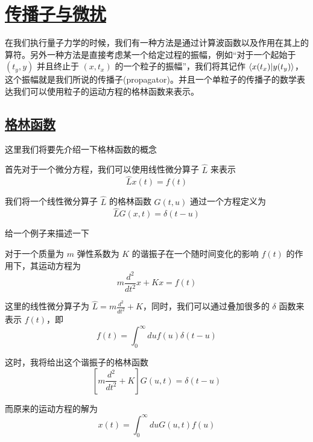 \chapter{\protect\hyperlink{:}{传播子与微扰}}


在我们执行量子力学的时候，我们有一种方法是通过计算波函数以及作用在其上的算符。另外一种方法是直接考虑某一个给定过程的振幅，例如“对于一个起始于 $(t_y,y)$ 并且终止于 $(x,t_x)$ 的一个粒子的振幅”，我们将其记作 $\bra{x(t_x)}\ket{y(t_y)}$，这个振幅就是我们所说的传播子(propagator)。并且一个单粒子的传播子的数学表达我们可以使用粒子的运动方程的格林函数来表示。

\section{\protect\hyperlink{:}{格林函数}}

这里我们将要先介绍一下格林函数的概念

首先对于一个微分方程，我们可以使用线性微分算子 $\hat{L}$ 来表示
\begin{equation*}
    \hat{L} x(t) = f(t)
\end{equation*}

我们将一个线性微分算子 $\hat{L}$ 的格林函数 $G(t,u)$ 通过一个方程定义为
\begin{equation*}
    \hat{L} G(x,t) = \delta (t - u)
\end{equation*}

给一个例子来描述一下
\begin{example}
    对于一个质量为 $m$ 弹性系数为 $K$ 的谐振子在一个随时间变化的影响 $f(t)$ 的作用下，其运动方程为 
    \begin{equation*}
        m\frac{d^2}{dt^2}{x} + Kx = f(t)
    \end{equation*}

    这里的线性微分算子为 $\displaystyle \hat{L} = m\frac{d^2}{dt^2} + K$，同时，我们可以通过叠加很多的 $\delta$ 函数来表示 $f(t)$，即
    \begin{equation*}
        f(t) = \int_0^\infty du f(u) \delta (t - u) 
    \end{equation*}
    
    这时，我将给出这个谐振子的格林函数
    \begin{equation*}
        \left[m\frac{d^2}{dt^2} + K\right]G(u,t) = \delta(t - u)
    \end{equation*}

    而原来的运动方程的解为
    \begin{equation*}
        x(t) = \int_0^\infty du G(u,t) f(u)
    \end{equation*}
\end{example}

